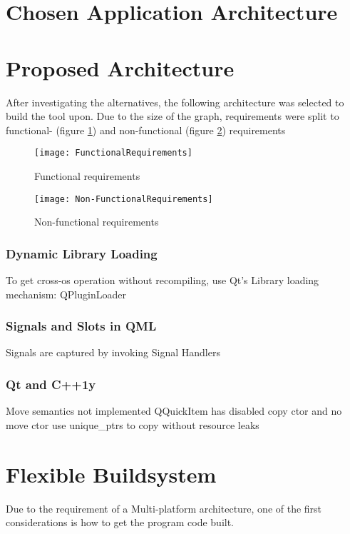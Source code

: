 \section{Chosen Application Architecture}

\section{Proposed Architecture}

After investigating the alternatives, the following architecture was selected to build the tool upon. Due to the size of the graph, requirements were split to functional- (figure \ref{fr}) and non-functional (figure \ref{nfr}) requirements  

\begin{figure}[p]
	\texttt{[image: FunctionalRequirements]}
	\caption{Functional requirements}
	\label{fr}
\end{figure}

\begin{figure}[p]
	\texttt{[image: Non-FunctionalRequirements]}
	\caption{Non-functional requirements}
	\label{nfr}
\end{figure}


\subsubsection{Dynamic Library Loading}



To get cross-\gls{os} operation without recompiling, use Qt's Library loading mechanism: QPluginLoader

\subsubsection{Signals and Slots in QML}
Signals are captured by invoking Signal Handlers

\subsubsection{Qt and C++1y}
Move semantics not implemented
QQuickItem has disabled copy ctor and no move ctor
use unique\_ptrs to copy without resource leaks

\section{Flexible Buildsystem}
Due to the requirement of a Multi-platform architecture, one of the first considerations is how to get the program code built.


